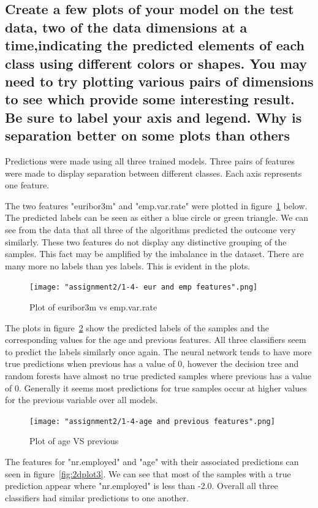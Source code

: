 \subsection{Create a few plots of your model on the test data, two of the data dimensions at a time,indicating the predicted elements of each class using different colors or shapes. You may need to try plotting various pairs of dimensions to see which provide some interesting result. Be sure to label your axis and legend. Why is separation better on some plots than others}


Predictions were made using all three trained models. Three pairs of features were made to display separation between different classes. Each axis represents one feature.

The two features "euribor3m" and "emp.var.rate" were plotted in figure~\ref{fig:2dplot1} below. The predicted labels can be seen as either a blue circle or green triangle. We can see from the data that all three of the algorithms predicted the outcome very similarly. These two features do not display any distinctive grouping of the samples. This fact may be amplified by the imbalance in the dataset. There are many more no labels than yes labels. This is evident in the plots. 

\clearpage{}
\begin{figure}[!ht]
 \centering
\texttt{[image: "assignment2/1-4- eur and emp features".png]}
\caption{\label{fig:2dplot1}Plot of euribor3m vs emp.var.rate }
\end{figure}

The plots in figure~\ref{fig:2dplot2} show the predicted labels of the samples and the corresponding values for the age and previous features. All three classifiers seem to predict the labels similarly once again. The neural network tends to have more true predictions when previous has a value of 0, however the decision tree and random forests have almost no true predicted samples where previous has a value of 0. Generally it seems most predictions for true samples occur at higher values for the previous variable over all models.

\clearpage{}
\begin{figure}[!ht]
 \centering
\texttt{[image: "assignment2/1-4-age and previous features".png]}
\caption{\label{fig:2dplot2}Plot of age VS previous }
\end{figure}


The features for "nr.employed" and "age" with their associated predictions can seen in figure~\ref{fig:2dplot3}. We can see that most of the samples with a true prediction appear where "nr.employed" is less than -2.0. Overall all three classifiers had similar predictions to one another.


